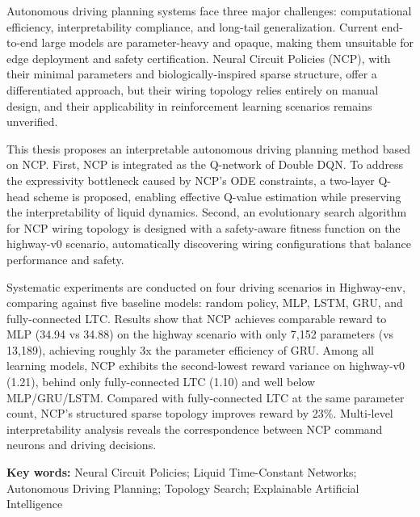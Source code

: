 \xiaosi

Autonomous driving planning systems face three major challenges: computational efficiency, interpretability compliance, and long-tail generalization. Current end-to-end large models are parameter-heavy and opaque, making them unsuitable for edge deployment and safety certification. Neural Circuit Policies (NCP), with their minimal parameters and biologically-inspired sparse structure, offer a differentiated approach, but their wiring topology relies entirely on manual design, and their applicability in reinforcement learning scenarios remains unverified.

This thesis proposes an interpretable autonomous driving planning method based on NCP. First, NCP is integrated as the Q-network of Double DQN. To address the expressivity bottleneck caused by NCP's ODE constraints, a two-layer Q-head scheme is proposed, enabling effective Q-value estimation while preserving the interpretability of liquid dynamics. Second, an evolutionary search algorithm for NCP wiring topology is designed with a safety-aware fitness function on the highway-v0 scenario, automatically discovering wiring configurations that balance performance and safety.

Systematic experiments are conducted on four driving scenarios in Highway-env, comparing against five baseline models: random policy, MLP, LSTM, GRU, and fully-connected LTC. Results show that NCP achieves comparable reward to MLP (34.94 vs 34.88) on the highway scenario with only 7,152 parameters (vs 13,189), achieving roughly 3x the parameter efficiency of GRU. Among all learning models, NCP exhibits the second-lowest reward variance on highway-v0 (1.21), behind only fully-connected LTC (1.10) and well below MLP/GRU/LSTM. Compared with fully-connected LTC at the same parameter count, NCP's structured sparse topology improves reward by 23\%. Multi-level interpretability analysis reveals the correspondence between NCP command neurons and driving decisions.


\vspace{\baselineskip}
\noindent \xiaosi\textbf{ Key words:} \xiaosi Neural Circuit Policies; Liquid Time-Constant Networks; Autonomous Driving Planning; Topology Search; Explainable Artificial Intelligence